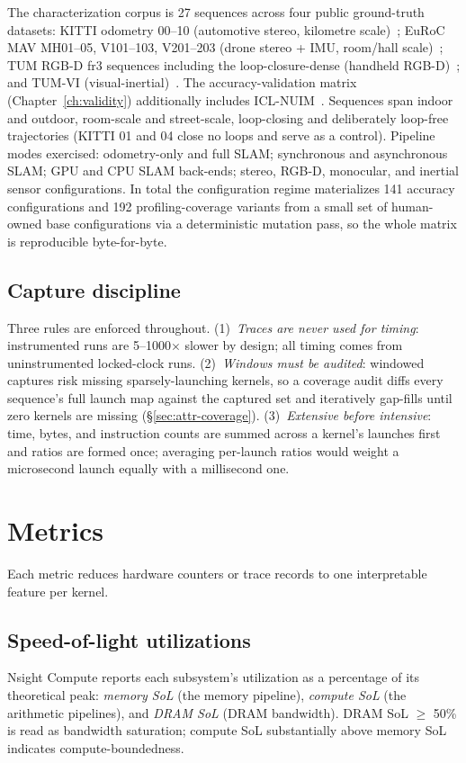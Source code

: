 The characterization corpus is 27 sequences across four public ground-truth
datasets: KITTI odometry 00--10 (automotive stereo, kilometre
scale)~\cite{geiger2013kitti}; EuRoC MAV MH01--05, V101--103, V201--203
(drone stereo + IMU, room/hall scale)~\cite{burri2016euroc}; TUM RGB-D fr3
sequences including the loop-closure-dense 
(handheld RGB-D)~\cite{sturm2012tum}; and TUM-VI
(visual-inertial)~\cite{schubert2018tumvi}. The accuracy-validation matrix
(Chapter~\ref{ch:validity}) additionally includes
ICL-NUIM~\cite{handa2014iclnuim}. Sequences span indoor and outdoor,
room-scale and street-scale, loop-closing and deliberately loop-free
trajectories (KITTI 01 and 04 close no loops and serve as a control).
Pipeline modes exercised: odometry-only and full SLAM; synchronous and
asynchronous SLAM; GPU and CPU SLAM back-ends; stereo, RGB-D, monocular, and
inertial sensor configurations. In total the configuration regime
materializes 141 accuracy configurations and 192 profiling-coverage
variants from a small set of human-owned base configurations via a
deterministic mutation pass, so the whole matrix is reproducible
byte-for-byte.

\subsection{Capture discipline}

Three rules are enforced throughout. (1)~\emph{Traces are never used for
timing}: instrumented runs are 5--1000$\times$ slower by design; all timing
comes from uninstrumented locked-clock runs. (2)~\emph{Windows must be
audited}: windowed captures risk missing sparsely-launching kernels, so a
coverage audit diffs every sequence's full launch map against the captured
set and iteratively gap-fills until zero kernels are missing
(\S\ref{sec:attr-coverage}). (3)~\emph{Extensive before intensive}: time,
bytes, and instruction counts are summed across a kernel's launches first
and ratios are formed once; averaging per-launch ratios would weight a
microsecond launch equally with a millisecond one.

\section{Metrics}
\label{sec:met-metrics}

Each metric reduces hardware counters or trace records to one interpretable
feature per kernel.

\subsection{Speed-of-light utilizations}
Nsight Compute reports each subsystem's utilization as a percentage of its
theoretical peak: \emph{memory SoL} (the memory pipeline),
\emph{compute SoL} (the arithmetic pipelines), and \emph{DRAM SoL} (DRAM
bandwidth). DRAM SoL $\geq$ 50\% is read as bandwidth saturation; compute
SoL substantially above memory SoL indicates compute-boundedness.

